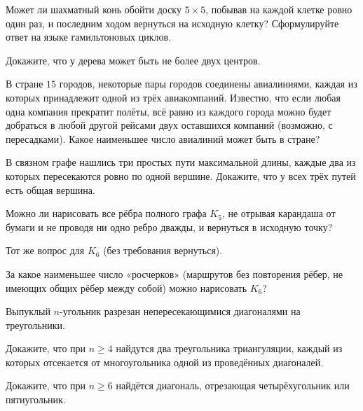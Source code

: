 \begin{problems}
\item Может ли шахматный конь обойти доску $5\times5$, побывав на каждой клетке ровно один раз, и последним ходом вернуться на исходную клетку? Сформулируйте ответ на языке гамильтоновых циклов.

\item Докажите, что у дерева может быть не более двух центров.

\item В стране $15$ городов, некоторые пары городов соединены авиалиниями, каждая из которых принадлежит одной из трёх авиакомпаний. Известно, что если любая одна компания прекратит полёты, всё равно из каждого города можно будет добраться в любой другой рейсами двух оставшихся компаний (возможно, с пересадками). Какое наименьшее число авиалиний может быть в стране?

\item В связном графе нашлись три простых пути максимальной длины, каждые два из которых пересекаются ровно по одной вершине. Докажите, что у всех трёх путей есть общая вершина.

\item
\begin{parts}
  \item Можно ли нарисовать все рёбра полного графа $K_5$, не отрывая карандаша от бумаги и не проводя ни одно ребро дважды, и вернуться в исходную точку?
  \item Тот же вопрос для $K_6$ (без требования вернуться).
  \item За какое наименьшее число «росчерков» (маршрутов без повторения рёбер, не имеющих общих рёбер между собой) можно нарисовать $K_6$?
\end{parts}

\item Выпуклый $n$-угольник разрезан непересекающимися диагоналями на треугольники.
\begin{parts}
  \item Докажите, что при $n\ge4$ найдутся два треугольника триангуляции, каждый из которых отсекается от многоугольника одной из проведённых диагоналей.
  \item Докажите, что при $n\ge6$ найдётся диагональ, отрезающая четырёхугольник или пятиугольник.
\end{parts}


\end{problems}
